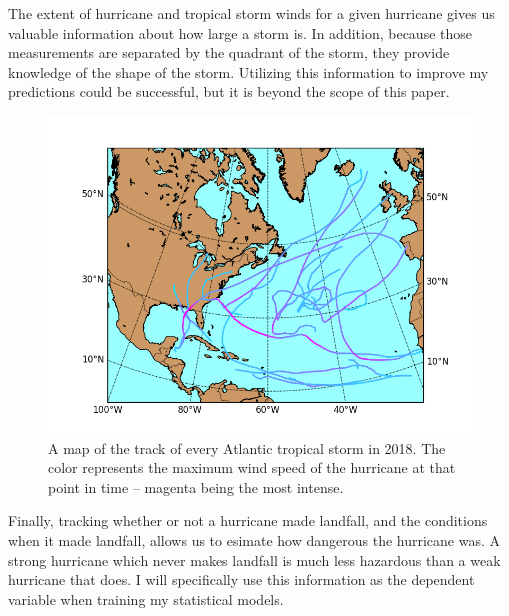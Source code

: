 \par
The extent of hurricane and tropical storm winds for a given hurricane gives us valuable information about how large a storm is.
In addition, because those measurements are separated by the quadrant of the storm, they provide knowledge of the shape of the storm.
Utilizing this information to improve my predictions could be successful, but it is beyond the scope of this paper.

\begin{figure}
	\centering
	\includegraphics[width=\linewidth]{images/2018_max_winds.png}
	\caption{A map of the track of every Atlantic tropical storm in 2018. The color represents the maximum wind speed of the hurricane at that point in time -- magenta being the most intense.}
	\label{fig:2018_storm_tracks}
\end{figure}

\par
Finally, tracking whether or not a hurricane made landfall, and the conditions when it made landfall, allows us to esimate how dangerous the hurricane was.
A strong hurricane which never makes landfall is much less hazardous than a weak hurricane that does.
I will specifically use this information as the dependent variable when training my statistical models.


